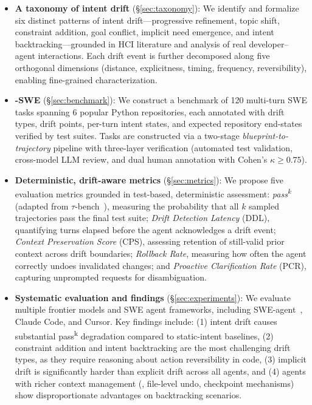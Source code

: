 \begin{itemize}[leftmargin=*, itemsep=2pt]
    \item \textbf{A taxonomy of intent drift} (\S\ref{sec:taxonomy}): We identify and formalize six distinct patterns of intent drift---progressive refinement, topic shift, constraint addition, goal conflict, implicit need emergence, and intent backtracking---grounded in HCI literature and analysis of real developer--agent interactions. Each drift event is further decomposed along five orthogonal dimensions (distance, explicitness, timing, frequency, reversibility), enabling fine-grained characterization.

    \item \textbf{\bench{}-SWE} (\S\ref{sec:benchmark}): We construct a benchmark of 120 multi-turn SWE tasks spanning 6 popular Python repositories, each annotated with drift types, drift points, per-turn intent states, and expected repository end-states verified by test suites. Tasks are constructed via a two-stage \emph{blueprint-to-trajectory} pipeline with three-layer verification (automated test validation, cross-model LLM review, and dual human annotation with Cohen's $\kappa \geq 0.75$).

    \item \textbf{Deterministic, drift-aware metrics} (\S\ref{sec:metrics}): We propose five evaluation metrics grounded in test-based, deterministic assessment: \emph{pass\textsuperscript{k}} (adapted from $\tau$-bench~\citep{yao2024taubench}), measuring the probability that all $k$ sampled trajectories pass the final test suite; \emph{Drift Detection Latency} (DDL), quantifying turns elapsed before the agent acknowledges a drift event; \emph{Context Preservation Score} (CPS), assessing retention of still-valid prior context across drift boundaries; \emph{Rollback Rate}, measuring how often the agent correctly undoes invalidated changes; and \emph{Proactive Clarification Rate} (PCR), capturing unprompted requests for disambiguation.

    \item \textbf{Systematic evaluation and findings} (\S\ref{sec:experiments}): We evaluate multiple frontier models and SWE agent frameworks, including SWE-agent~\citep{yang2024sweagent}, Claude Code, and Cursor. Key findings include: (1) intent drift causes substantial pass\textsuperscript{k} degradation compared to static-intent baselines, (2) constraint addition and intent backtracking are the most challenging drift types, as they require reasoning about action reversibility in code, (3) implicit drift is significantly harder than explicit drift across all agents, and (4) agents with richer context management (\eg, file-level undo, checkpoint mechanisms) show disproportionate advantages on backtracking scenarios.
\end{itemize}

